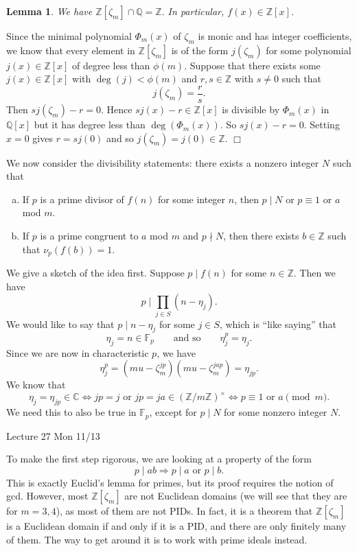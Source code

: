 \documentclass{article}
\def\Z{{\mathbb Z}}
\def\F{{\mathbb F}}
\def\Q{{\mathbb Q}}
\def\Z{{\mathbb Z}}
\def\F{{\mathbb F}}
\def\Q{{\mathbb Q}}
\def\C{{\mathbb C}}
\newtheorem{lemma}[subsection]{Lemma}
\newenvironment{proof}{\noindent {\bf Proof:}}{$\Box$ \vspace{2 ex}}
\newcommand{\add}[1]{{\color{blue} #1}}
\begin{document}
\begin{lemma}
    We have $\Z[\zeta_m]\cap\Q = \Z.$ In particular, $f(x)\in\Z[x]$.
\end{lemma}

\begin{proof}
    Since the minimal polynomial $\Phi_m(x)$ of $\zeta_m$ is monic and has integer coefficients, we know that every element in $\Z[\zeta_m]$ is of the form $j(\zeta_m)$ for some polynomial $j(x)\in\Z[x]$ of degree less than $\phi(m)$. Suppose that there exists some $j(x)\in\Z[x]$ with $\deg(j)<\phi(m)$ and $r,s\in\Z$ with $s\neq 0$ such that $$j(\zeta_m) = \frac{r}{s}.$$
    Then $sj(\zeta_m) - r = 0$. Hence $sj(x) - r\in\Z[x]$ is divisible by $\Phi_m(x)$ in $\Q[x]$ but it has degree less than $\deg(\Phi_m(x))$. So $sj(x) - r = 0$. Setting $x = 0$ gives $r = sj(0)$ and so $j(\zeta_m) = j(0)\in\Z$.
\end{proof}

We now consider the divisibility statements: there exists a nonzero integer $N$ such that
\begin{enumerate}[(a)]
    \item If $p$ is a prime divisor of $f(n)$ for some integer $n$, then $p\mid N$ or $p\equiv 1$ or $a$ mod $m$.
    \item If $p$ is a prime congruent to $a$ mod $m$ and $p\nmid N$, then there exists $b\in\Z$ such that $\nu_p(f(b)) = 1$.
\end{enumerate}
We give a sketch of the idea first. Suppose $p\mid f(n)$ for some $n\in\Z$. Then we have
$$p\mid \prod_{j\in S}(n - \eta_j).$$
We would like to say that $p\mid n - \eta_j$ for some $j\in S$, which is ``like saying'' that $$\eta_j = n \in\F_p\qquad\mbox{and so}\qquad \eta_j^p = \eta_j.$$
Since we are now in characteristic $p$, we have
$$\eta_j^p = (mu - \zeta_m^{jp})(mu - \zeta_m^{jap}) = \eta_{jp}.$$
We know that $$\eta_j = \eta_{jp}\in\C\Longleftrightarrow jp = j\mbox{ or }jp = ja\in(\Z/m\Z)^\times \Longleftrightarrow p\equiv 1\mbox{ or }a\pmod{m}.$$
We need this to also be true in $\F_p$, except for $p\mid N$ for some nonzero integer $N$.

\begin{center}
    \add{Lecture 27 Mon 11/13}
\end{center}

To make the first step rigorous, we are looking at a property of the form $$p\mid ab\Rightarrow p\mid a\mbox{ or }p\mid b.$$
This is exactly Euclid's lemma for primes, but its proof requires the notion of gcd. However, most $\Z[\zeta_m]$ are not Euclidean domains (we will see that they are for $m=3,4$), as most of them are not PIDs. In fact, it is a theorem that $\Z[\zeta_m]$ is a Euclidean domain if and only if it is a PID, and there are only finitely many of them. The way to get around it is to work with prime ideals instead.
\end{document}
